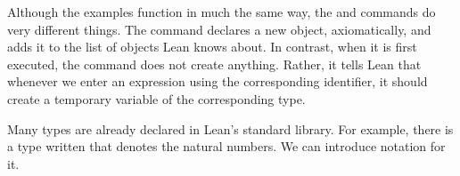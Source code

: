 \documentclass[letterpaper,10pt,english]{sphinxmanual}
\begin{document}
\begin{sphinxVerbatim}[commandchars=\\\{\}]
   

   
     
       
     
       

    

 
  
   
    

     
   
\end{sphinxVerbatim}

\sphinxAtStartPar
Although the examples function in much the same way, the  and  commands do very different things. The  command declares a new object, axiomatically, and adds it to the list of objects Lean knows about. In contrast, when it is first executed, the  command does not create anything. Rather, it tells Lean that whenever we enter an expression using the corresponding identifier, it should create a temporary variable of the corresponding type.

\sphinxAtStartPar
Many types are already declared in Lean’s standard library.
For example,
there is a type written  that denotes the natural numbers.
We can introduce notation  for it.

\begin{sphinxVerbatim}[commandchars=\\\{\}]
 

   

 
\end{sphinxVerbatim}
\end{document}
